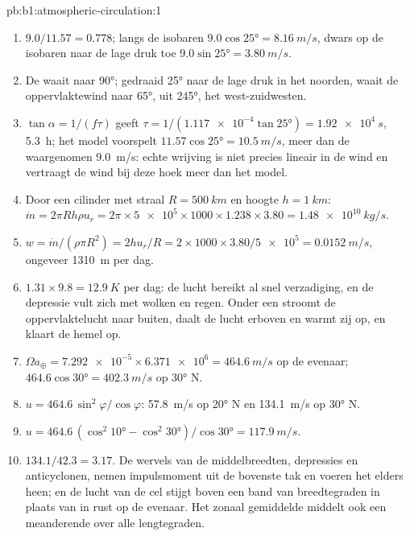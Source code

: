 \begin{solution}{pb:b1:atmospheric-circulation:1}
\begin{enumerate}
        het evenwicht heeft geen tijd om tot stand te komen, en de formule geldt niet.
  \item $9.0/11.57 = 0.778$; langs de isobaren $9.0\cos\ang{25} = \qty{8.16}{m/s}$,
        dwars op de isobaren naar de lage druk toe $9.0\sin\ang{25} = \qty{3.80}{m/s}$.
  \item De  waait naar  \ang{90}; gedraaid \ang{25} naar de lage druk in het noorden, waait de oppervlaktewind naar \ang{65},
        uit \ang{245}, het west-zuidwesten.
  \item $\tan\alpha = 1/(f\tau)$ geeft $\tau = 1/(\num{1.117e-4}\tan\ang{25}) =
        \qty{1.92e4}{s}$, \qty{5.3}{h}; het model voorspelt $11.57\cos\ang{25} =
        \qty{10.5}{m/s}$, meer dan de waargenomen \qty{9.0}{m/s}: echte wrijving is niet precies lineair in de wind en vertraagt de wind bij deze hoek meer dan het model.
  \item Door een cilinder met straal $R = \qty{500}{km}$ en hoogte $h =
        \qty{1}{km}$: $\dot m = 2\pi R h\rho u_r = 2\pi \times \num{5e5} \times 1000
        \times 1.238 \times 3.80 = \qty{1.48e10}{kg/s}$.
  \item $w = \dot m/(\rho\pi R^2) = 2hu_r/R = 2 \times 1000 \times 3.80/\num{5e5} =
        \qty{0.0152}{m/s}$, ongeveer \qty{1310}{m} per dag.
  \item $1.31 \times 9.8 = \qty{12.9}{K}$ per dag: de lucht bereikt al snel verzadiging,
        en de depressie vult zich met wolken en regen. Onder een  stroomt de oppervlaktelucht naar buiten, daalt de lucht erboven en warmt zij op, en klaart de hemel op.
  \item $\Omega a_\oplus = \num{7.292e-5} \times \num{6.371e6} = \qty{464.6}{m/s}$
        op de evenaar; $464.6\cos\ang{30} = \qty{402.3}{m/s}$ op \ang{30} N.
  \item $u = 464.6\,\sin^2\varphi/\cos\varphi$: \qty{57.8}{m/s} op \ang{20} N en
        \qty{134.1}{m/s} op \ang{30} N.
  \item $u = 464.6\,(\cos^2\ang{10} - \cos^2\ang{30})/\cos\ang{30} =
        \qty{117.9}{m/s}$.
  \item $134.1/42.3 = 3.17$. De wervels van de middelbreedten, depressies en
        anticyclonen, nemen impulsmoment uit de bovenste tak en voeren het elders heen; en de lucht van de cel stijgt boven een band van breedtegraden in plaats van in rust op de evenaar. Het zonaal gemiddelde middelt ook een meanderende  over alle lengtegraden.

\end{enumerate}
\end{solution}
